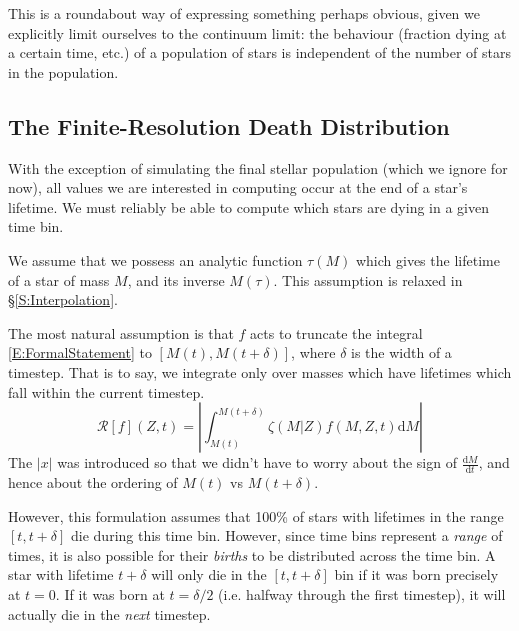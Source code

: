 \documentclass[a4paper,11pt]{article}
\def\d{\mathrm d}
\begin{document}
			This is a roundabout way of expressing something perhaps obvious, given we explicitly limit ourselves to the continuum limit: the behaviour (fraction dying at a certain time, etc.) of a population of stars is independent of the number of stars in the population.


		\subsection{The Finite-Resolution Death Distribution}
			With the exception of simulating the final stellar population (which we ignore for now), all values we are interested in computing occur at the end of a star's lifetime. We must reliably be able to compute which stars are dying in a given time bin. 

			We assume that we possess an analytic function $\tau(M)$ which gives the lifetime of a star of mass $M$, and its inverse $M(\tau)$. This assumption is relaxed in \S\ref{S:Interpolation}.

			The most natural assumption is that $f$ acts to truncate the integral \eqref{E:FormalStatement} to $[M(t),M(t+\delta)]$, where $\delta$ is the width of a timestep. That is to say, we integrate only over masses which have lifetimes which fall within the current timestep.
			\begin{equation}
				\mathcal{R}[f](Z,t) = \left|\int_{M(t)}^{M(t+\delta)} \zeta(M|Z) f(M,Z,t) \d M \right|
			\end{equation}
			The $|x|$ was introduced so that we didn't have to worry about the sign of $\frac{\d M}{\d t}$, and hence about the ordering of $M(t)$ vs $M(t+\delta)$. 
			
			However, this formulation assumes that 100\% of stars with lifetimes in the range $[t,t+\delta]$ die during this time bin. However, since time bins represent a \textit{range} of times, it is also possible for their \textit{births} to be distributed across the time bin. A star with lifetime $t+\delta$ will only die in the $[t,t+\delta]$ bin if it was born precisely at $t = 0$. If it was born at $t = \delta/2$ (i.e. halfway through the first timestep), it will actually die in the \textit{next} timestep.
\end{document}
